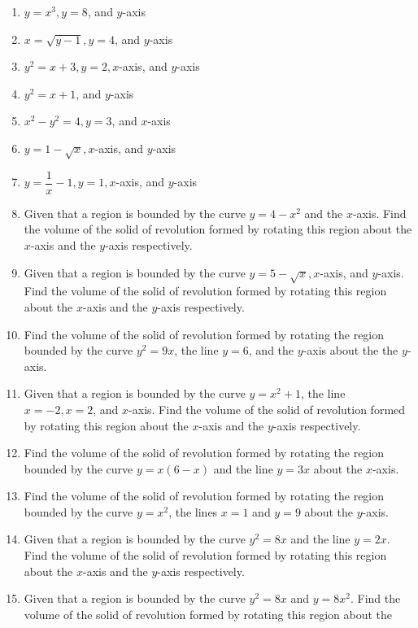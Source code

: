 \documentclass{report}
\begin{document}
\begin{enumerate}[resume]
    \item $y=x^3, y=8$, and $y$-axis
    \item $x=\sqrt{y-1}, y=4$, and $y$-axis
    \item $y^2=x+3, y=2, x$-axis, and $y$-axis
    \item $y^2=x+1$, and $y$-axis
    \item $x^2-y^2=4, y=3$, and $x$-axis
    \item $y=1-\sqrt{x}, x$-axis, and $y$-axis
    \item $y=\dfrac{1}{x}-1, y=1, x$-axis, and $y$-axis
    \item Given that a region is bounded by the curve $y=4-x^2$ and the $x$-axis. Find
          the volume of the solid of revolution formed by rotating this region about the
          $x$-axis and the $y$-axis respectively.
    \item Given that a region is bounded by the curve $y=5-\sqrt{x}, x$-axis, and
          $y$-axis. Find the volume of the solid of revolution formed by rotating this
          region about the $x$-axis and the $y$-axis respectively.
    \item Find the volume of the solid of revolution formed by rotating the region
          bounded by the curve $y^2=9 x$, the line $y=6$, and the $y$-axis about the the
          $y$-axis.
    \item Given that a region is bounded by the curve $y=x^2+1$, the line $x=-2, x=2$,
          and $x$-axis. Find the volume of the solid of revolution formed by rotating
          this region about the $x$-axis and the $y$-axis respectively.
    \item Find the volume of the solid of revolution formed by rotating the region
          bounded by the curve $y=x(6-x)$ and the line $y=3 x$ about the $x$-axis.
    \item Find the volume of the solid of revolution formed by rotating the region
          bounded by the curve $y=x^2$, the lines $x=1$ and $y=9$ about the $y$-axis.
    \item Given that a region is bounded by the curve $y^2=8 x$ and the line $y=2 x$.
          Find the volume of the solid of revolution formed by rotating this region about
          the $x$-axis and the $y$-axis respectively.
    \item Given that a region is bounded by the curve $y^2=8 x$ and $y=8 x^2$. Find the
          volume of the solid of revolution formed by rotating this region about the

\end{enumerate}
\end{document}
